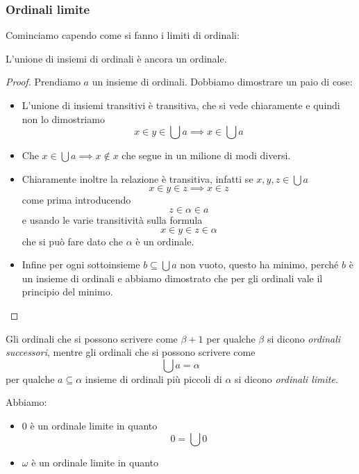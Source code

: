 \documentclass[11pt]{scrartcl}
\begin{document}
 	\subsubsection{Ordinali limite}
 	Cominciamo capendo come si fanno i limiti di ordinali:
 	\begin{proposition}
 		L'unione di insiemi di ordinali è ancora un ordinale.
 	\end{proposition}
 	\begin{proof}
 		Prendiamo $a$ un insieme di ordinali. Dobbiamo dimostrare un paio di cose:
 		\begin{itemize}
 			\item L'unione di insiemi transitivi è transitiva, che si vede chiaramente e quindi non lo dimostriamo
 			$$x\in y\in \bigcup a \implies x\in \bigcup a$$
 			\item Che $x\in \bigcup a \implies x\not\in x$ che segue in un milione di modi diversi.
 			\item Chiaramente inoltre la relazione è transitiva, infatti se $x,y,z\in \bigcup a$
 			$$x\in y \in z \implies x\in z$$
 			come prima introducendo 
 			$$z\in \alpha\in a$$
 			e usando le varie transitività sulla formula
 			$$x\in y \in z \in \alpha$$
 			che si può fare dato che $\alpha$ è un ordinale.
 			\item Infine per ogni sottoinsieme $b\subseteq \bigcup a $ non vuoto, questo ha minimo, perché $b$ è un insieme di ordinali e abbiamo dimostrato che per gli ordinali vale il principio del minimo.
 		\end{itemize}
 	\end{proof}
 	\begin{definition}
 		Gli ordinali che si possono scrivere come $\beta+1$ per qualche $\beta$ si dicono \textit{ordinali successori}, mentre gli ordinali che si possono scrivere come
 		$$\bigcup a=\alpha$$
 		per qualche $a\subseteq \alpha$ insieme di ordinali più piccoli di $\alpha$ si dicono \textit{ordinali limite}. 
 	\end{definition}
 	\begin{example}
 		Abbiamo:
 		\begin{itemize}
 			\item $0$ è un ordinale limite in quanto
 			$$0=\bigcup 0$$
 			\item $\omega$ è un ordinale limite in quanto
 			$$$$
 		\end{itemize}
 	\end{example}
\end{document}
